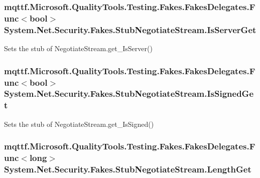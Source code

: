 \hypertarget{class_system_1_1_net_1_1_security_1_1_fakes_1_1_stub_negotiate_stream_a69f1ca37880bafb9c5b423ee4423922c}{
\subsubsection[{Is\-Server\-Get}]{\setlength{\rightskip}{0pt plus 5cm}mqttf.\-Microsoft.\-Quality\-Tools.\-Testing.\-Fakes.\-Fakes\-Delegates.\-Func$<$bool$>$ System.\-Net.\-Security.\-Fakes.\-Stub\-Negotiate\-Stream.\-Is\-Server\-Get}}\label{class_system_1_1_net_1_1_security_1_1_fakes_1_1_stub_negotiate_stream_a69f1ca37880bafb9c5b423ee4423922c}


Sets the stub of Negotiate\-Stream.\-get\-\_\-\-Is\-Server()

\hypertarget{class_system_1_1_net_1_1_security_1_1_fakes_1_1_stub_negotiate_stream_aaaa6f91a76d08fbe28c485acd75f8110}{
\subsubsection[{Is\-Signed\-Get}]{\setlength{\rightskip}{0pt plus 5cm}mqttf.\-Microsoft.\-Quality\-Tools.\-Testing.\-Fakes.\-Fakes\-Delegates.\-Func$<$bool$>$ System.\-Net.\-Security.\-Fakes.\-Stub\-Negotiate\-Stream.\-Is\-Signed\-Get}}\label{class_system_1_1_net_1_1_security_1_1_fakes_1_1_stub_negotiate_stream_aaaa6f91a76d08fbe28c485acd75f8110}


Sets the stub of Negotiate\-Stream.\-get\-\_\-\-Is\-Signed()

\hypertarget{class_system_1_1_net_1_1_security_1_1_fakes_1_1_stub_negotiate_stream_a05dd425c3198fd6996afdfe4f1eacf0c}{
\subsubsection[{Length\-Get}]{\setlength{\rightskip}{0pt plus 5cm}mqttf.\-Microsoft.\-Quality\-Tools.\-Testing.\-Fakes.\-Fakes\-Delegates.\-Func$<$long$>$ System.\-Net.\-Security.\-Fakes.\-Stub\-Negotiate\-Stream.\-Length\-Get}}\label{class_system_1_1_net_1_1_security_1_1_fakes_1_1_stub_negotiate_stream_a05dd425c3198fd6996afdfe4f1eacf0c}


